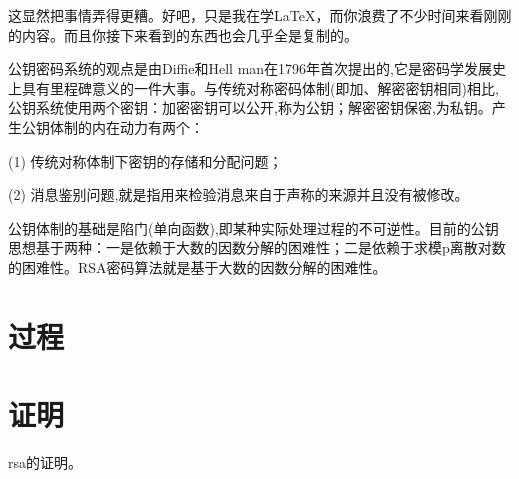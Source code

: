 \documentclass[a4paper]{article}  %
\begin{document}
\clearpage
这显然把事情弄得更糟。好吧，只是我在学\LaTeX，而你浪费了不少时间来看刚刚的内容。而且你接下来看到的东西也会几乎全是复制的。

公钥密码系统的观点是由Diffie和Hell man在1796年首次提出的,它是密码学发展史上具有里程碑意义的一件大事。与传统对称密码体制(即加、解密密钥相同)相比,
公钥系统使用两个密钥：加密密钥可以公开,称为公钥；解密密钥保密,为私钥。产生公钥体制的内在动力有两个：

(1) 传统对称体制下密钥的存储和分配问题；

(2) 消息鉴别问题,就是指用来检验消息来自于声称的来源并且没有被修改。

公钥体制的基础是陷门(单向函数),即某种实际处理过程的不可逆性。目前的公钥思想基于两种：一是依赖于大数的因数分解的困难性；二是依赖于求模p离散对数的困难性。RSA密码算法就是基于大数的因数分解的困难性。


\section{过程}

\section[awa]{证明}
rsa的证明。

\end{document}
